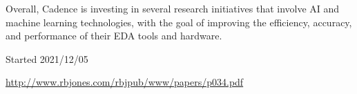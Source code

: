 \documentclass[10pt,titlepage]{book}
\begin{document}
Overall, Cadence is investing in several research initiatives that involve AI and machine learning technologies, with the goal of improving the efficiency, accuracy, and performance of their EDA tools and hardware.

{}





Started 2021/12/05


\href{http://www.rbjones.com/rbjpub/www/papers/p034.pdf}{http://www.rbjones.com/rbjpub/www/papers/p034.pdf}

\end{document}

